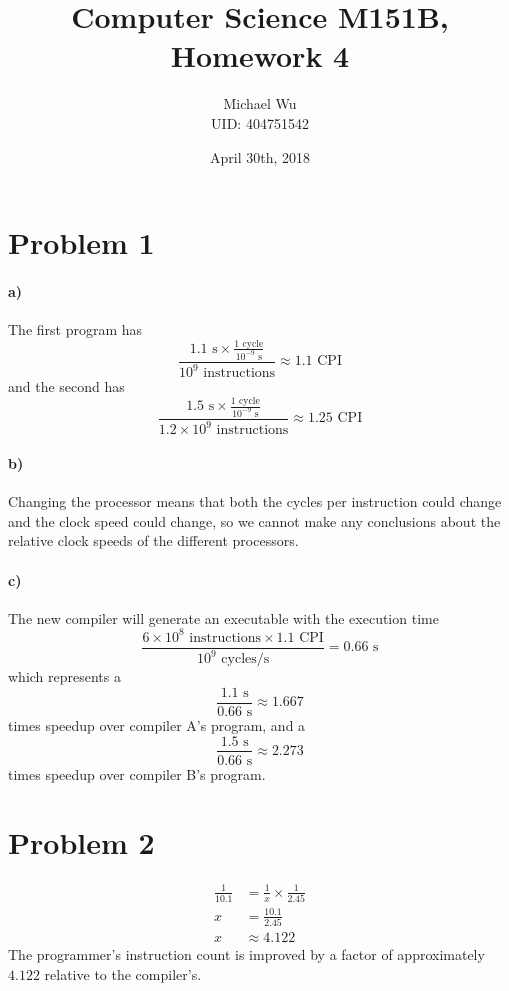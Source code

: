 \documentclass[12pt]{article}
\begin{document}
\title{Computer Science M151B, Homework 4}
\date{April 30th, 2018}
\author{Michael Wu\\UID: 404751542}
\maketitle

\section*{Problem 1}

\paragraph{a)}

The first program has
\[\frac{1.1 \text{ s} \times\frac{1 \text{ cycle}}{10^{-9} \text{ s}}}{10^9\text{ instructions}}\approx 1.1 \text{ CPI}\]
and the second has
\[\frac{1.5 \text{ s} \times\frac{1 \text{ cycle}}{10^{-9} \text{ s}}}{1.2\times 10^9\text{ instructions}}\approx 1.25 \text{ CPI}\]

\paragraph{b)}

Changing the processor means that both the cycles per instruction could change and the clock speed could change, so we cannot make any conclusions
about the relative clock speeds of the different processors.

\paragraph{c)}

The new compiler will generate an executable with the execution time
\[\frac{6\times 10^8 \text{ instructions} \times 1.1 \text{ CPI}}{10^9 \text{ cycles/s}} = 0.66 \text{ s}\]
which represents a
\[\frac{1.1\text{ s}}{0.66\text{ s}}\approx 1.667\]
times speedup over compiler A's program, and a
\[\frac{1.5\text{ s}}{0.66\text{ s}}\approx 2.273\]
times speedup over compiler B's program.

\section*{Problem 2}

\begin{align*}
        \frac{1}{10.1}&=\frac{1}{x}\times\frac{1}{2.45}\\
        x&=\frac{10.1}{2.45}\\
        x&\approx 4.122
\end{align*}
The programmer's instruction count is improved by a factor of approximately \(4.122\) relative to the compiler's.
\end{document}
